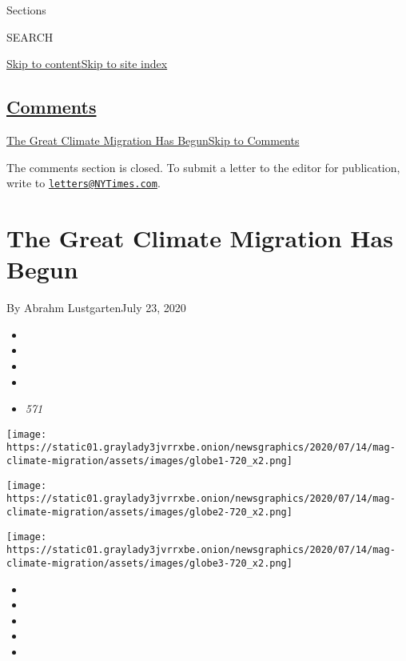Sections

SEARCH

\protect\hyperlink{site-content}{Skip to
content}\protect\hyperlink{site-index}{Skip to site index}

\hypertarget{comments}{%
\subsection{\texorpdfstring{\protect\hyperlink{commentsContainer}{Comments}}{Comments}}\label{comments}}

\href{}{The Great Climate Migration Has Begun}\href{}{Skip to Comments}

The comments section is closed. To submit a letter to the editor for
publication, write to
\href{mailto:letters@NYTimes.com}{\nolinkurl{letters@NYTimes.com}}.

\hypertarget{the-great-climate-migration-has-begun}{%
\section{The Great Climate Migration Has
Begun}\label{the-great-climate-migration-has-begun}}

By Abrahm LustgartenJuly 23, 2020

\begin{itemize}
\item
\item
\item
\item
\item
  \emph{571}
\end{itemize}

\texttt{[image: https://static01.graylady3jvrrxbe.onion/newsgraphics/2020/07/14/mag-climate-migration/assets/images/globe1-720\_x2.png]}

\texttt{[image: https://static01.graylady3jvrrxbe.onion/newsgraphics/2020/07/14/mag-climate-migration/assets/images/globe2-720\_x2.png]}

\texttt{[image: https://static01.graylady3jvrrxbe.onion/newsgraphics/2020/07/14/mag-climate-migration/assets/images/globe3-720\_x2.png]}

\begin{itemize}
\item
\item
\item
\item
\item
\end{itemize}

